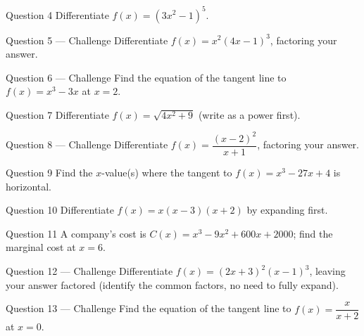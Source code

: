 \documentclass[11pt]{article}
\begin{document}
\begin{qbox}{Question 4}
Differentiate $f(x)=(3x^2-1)^5$.\workspace{2.4cm}
\end{qbox}

\begin{qbox}{Question 5 --- Challenge}
Differentiate $f(x)=x^2(4x-1)^3$, factoring your answer.\workspace{3.4cm}
\end{qbox}

\begin{qbox}{Question 6 --- Challenge}
Find the equation of the tangent line to $f(x)=x^3-3x$ at $x=2$.\workspace{3.4cm}
\end{qbox}

\begin{qbox}{Question 7}
Differentiate $f(x)=\sqrt{4x^2+9}$ (write as a power first).\workspace{2.4cm}
\end{qbox}

\begin{qbox}{Question 8 --- Challenge}
Differentiate $f(x)=\dfrac{(x-2)^2}{x+1}$, factoring your answer.\workspace{3.4cm}
\end{qbox}

\begin{qbox}{Question 9}
Find the $x$-value(s) where the tangent to $f(x)=x^3-27x+4$ is horizontal.\workspace{2.4cm}
\end{qbox}

\begin{qbox}{Question 10}
Differentiate $f(x)=x(x-3)(x+2)$ by expanding first.\workspace{2.4cm}
\end{qbox}

\begin{qbox}{Question 11}
A company's cost is $C(x)=x^3-9x^2+600x+2000$; find the marginal cost at $x=6$.\workspace{2.4cm}
\end{qbox}

\begin{qbox}{Question 12 --- Challenge}
Differentiate $f(x)=(2x+3)^2(x-1)^3$, leaving your answer factored (identify the common factors, no need to fully expand).\workspace{3.4cm}
\end{qbox}

\begin{qbox}{Question 13 --- Challenge}
Find the equation of the tangent line to $f(x)=\dfrac{x}{x+2}$ at $x=0$.\workspace{3.4cm}
\end{qbox}

\clearpage
{}
\end{document}
